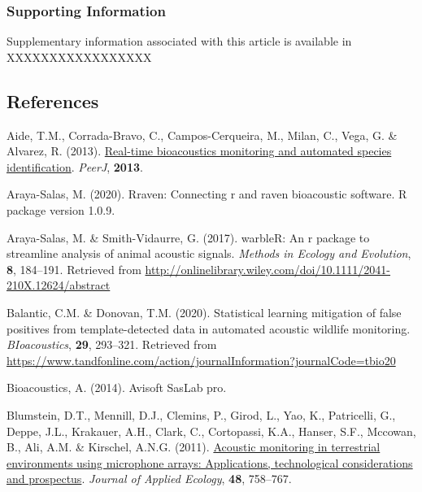 \documentclass[
]{article}
\newlength{\cslhangindent}
\newlength{\cslentryspacingunit} %
\newenvironment{CSLReferences}[2] %
 {%
  \setlength{\parindent}{0pt}
  \ifodd #1
  \let\oldpar\par
  \def\par{\hangindent=\cslhangindent\oldpar}
  \fi
  \setlength{\parskip}{#2\cslentryspacingunit}
 }%
 {}
\begin{document}
\hypertarget{supporting-information}{%
\subsubsection{Supporting Information}\label{supporting-information}}

Supplementary information associated with this article is available in
XXXXXXXXXXXXXXXXX

\hypertarget{references}{%
\subsection*{References}\label{references}}

\hypertarget{refs}{}
\begin{CSLReferences}{1}{0}
\leavevmode{}%
Aide, T.M., Corrada-Bravo, C., Campos-Cerqueira, M., Milan, C., Vega, G.
\& Alvarez, R. (2013).
\href{https://doi.org/10.7717/PEERJ.103}{Real-time bioacoustics
monitoring and automated species identification}. \emph{PeerJ},
\textbf{2013}.

\leavevmode{}%
Araya-Salas, M. (2020). Rraven: Connecting r and raven bioacoustic
software. R package version 1.0.9.

\leavevmode{}%
Araya-Salas, M. \& Smith-Vidaurre, G. (2017). warbleR: An r package to
streamline analysis of animal acoustic signals. \emph{Methods in Ecology
and Evolution}, \textbf{8}, 184--191. Retrieved from
\url{http://onlinelibrary.wiley.com/doi/10.1111/2041-210X.12624/abstract}

\leavevmode{}%
Balantic, C.M. \& Donovan, T.M. (2020). Statistical learning mitigation
of false positives from template-detected data in automated acoustic
wildlife monitoring. \emph{BIoacoustics}, \textbf{29}, 293--321.
Retrieved from
\url{https://www.tandfonline.com/action/journalInformation?journalCode=tbio20}

\leavevmode{}%
Bioacoustics, A. (2014). Avisoft SasLab pro.

\leavevmode{}%
Blumstein, D.T., Mennill, D.J., Clemins, P., Girod, L., Yao, K.,
Patricelli, G., Deppe, J.L., Krakauer, A.H., Clark, C., Cortopassi,
K.A., Hanser, S.F., Mccowan, B., Ali, A.M. \& Kirschel, A.N.G. (2011).
\href{https://doi.org/10.1111/j.1365-2664.2011.01993.x}{Acoustic
monitoring in terrestrial environments using microphone arrays:
Applications, technological considerations and prospectus}.
\emph{Journal of Applied Ecology}, \textbf{48}, 758--767.


\end{CSLReferences}
\end{document}
